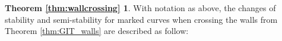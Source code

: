 \documentclass{amsart}
\numberwithin{equation}{section}
\theoremstyle{definition}
\begin{document}
\newtheorem*{thm:wallcrossing}{Theorem \ref{thm:wallcrossing}}
\begin{thm:wallcrossing}
With notation as above, the changes of stability and semi-stability for marked curves when crossing the walls from Theorem  \ref{thm:GIT_walls} are described as follow: 


\end{thm:wallcrossing}
\end{document}
